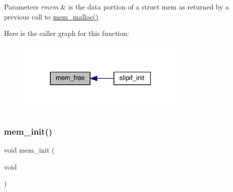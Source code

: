 \begin{DoxyParams}{Parameters}
{\em rmem} & is the data portion of a struct mem as returned by a previous call to \hyperlink{native_2lwip_2src_2core_2mem_8c_a932aa40d85b14cb7331625e012d12335}{mem\+\_\+malloc()} \\
\hline
\end{DoxyParams}
Here is the caller graph for this function\+:
\nopagebreak
\begin{figure}[H]
\begin{center}
\leavevmode
\includegraphics[width=231pt]{openmote-cc2538_2lwip_2src_2include_2lwip_2mem_8h_a2fd7aa1adf6e394d3be7c7734e7df41a_icgraph}
\end{center}
\end{figure}
\mbox{\label{openmote-cc2538_2lwip_2src_2include_2lwip_2mem_8h_a44a136e3b70c36abb6f8dc060c778113}} 
\subsubsection{\texorpdfstring{mem\+\_\+init()}{mem\_init()}}
{\footnotesize\ttfamily void mem\+\_\+init (\begin{DoxyParamCaption}\item[{void}]{ }\end{DoxyParamCaption})}

